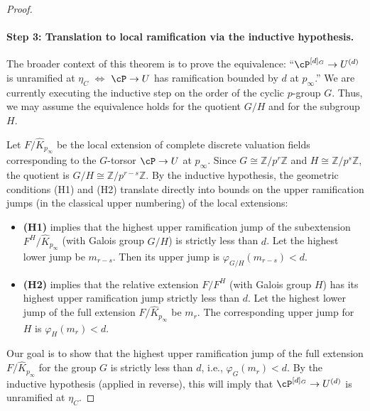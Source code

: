 \begin{proof}
\paragraph{Step 3: Translation to local ramification via the inductive hypothesis.}
The broader context of this theorem is to prove the equivalence: ``$\cP^{[d]_G} \to U^{(d)}$ is unramified at $\eta_C$ $\iff$ $\cP \to U$ has ramification bounded by $d$ at $p_\infty$.'' We are currently executing the inductive step on the order of the cyclic $p$-group $G$. Thus, we may assume the equivalence holds for the quotient $G/H$ and for the subgroup $H$. 

Let $F/\widehat{K}_{p_\infty}$ be the local extension of complete discrete valuation fields corresponding to the $G$-torsor $\cP \to U$ at $p_\infty$. Since $G \cong \mathbb{Z}/p^r\mathbb{Z}$ and $H \cong \mathbb{Z}/p^s\mathbb{Z}$, the quotient is $G/H \cong \mathbb{Z}/p^{r-s}\mathbb{Z}$. By the inductive hypothesis, the geometric conditions (H1) and (H2) translate directly into bounds on the upper ramification jumps (in the classical upper numbering) of the local extensions:
\begin{itemize}
    \item \textbf{(H1)} implies that the highest upper ramification jump of the subextension $F^H / \widehat{K}_{p_\infty}$ (with Galois group $G/H$) is strictly less than $d$. Let the highest lower jump be $m_{r-s}$. Then its upper jump is $\varphi_{G/H}(m_{r-s}) < d$.
    \item \textbf{(H2)} implies that the relative extension $F / F^H$ (with Galois group $H$) has its highest upper ramification jump strictly less than $d$. Let the highest lower jump of the full extension $F/\widehat{K}_{p_\infty}$ be $m_r$. The corresponding upper jump for $H$ is $\varphi_H(m_r) < d$.
\end{itemize}
Our goal is to show that the highest upper ramification jump of the full extension $F/\widehat{K}_{p_\infty}$ for the group $G$ is strictly less than $d$, i.e., $\varphi_G(m_r) < d$. By the inductive hypothesis (applied in reverse), this will imply that $\cP^{[d]_G} \to U^{(d)}$ is unramified at $\eta_C$.


\end{proof}
